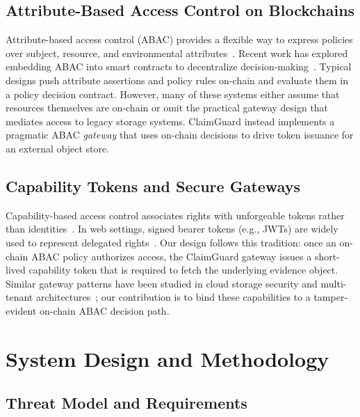 \documentclass[conference]{IEEEtran}
\begin{document}
\subsection{Attribute-Based Access Control on Blockchains}

Attribute-based access control (ABAC) provides a flexible way to express policies over subject, resource, and environmental attributes~\cite{hu2014abac}. 
Recent work has explored embedding ABAC into smart contracts to decentralize decision-making~\cite {sajidullah2023abacblockchain, muniswamy2025trustabac}. 
Typical designs push attribute assertions and policy rules on-chain and evaluate them in a policy decision contract.
However, many of these systems either assume that resources themselves are on-chain or omit the practical gateway design that mediates access to legacy storage systems.
ClaimGuard instead implements a pragmatic ABAC \emph{gateway} that uses on-chain decisions to drive token issuance for an external object store.

\subsection{Capability Tokens and Secure Gateways}

Capability-based access control associates rights with unforgeable tokens rather than identities~\cite{levy1984capabilities}. 
In web settings, signed bearer tokens (e.g., JWTs) are widely used to represent delegated rights~\cite{fotiou2021capability}. 
Our design follows this tradition: once an on-chain ABAC policy authorizes access, the ClaimGuard gateway issues a short-lived capability token that is required to fetch the underlying evidence object. 
Similar gateway patterns have been studied in cloud storage security and multi-tenant architectures~\cite{googlepatent2013cloud}; our contribution is to bind these capabilities to a tamper-evident on-chain ABAC decision path.

\section{System Design and Methodology}

\subsection{Threat Model and Requirements}
\end{document}
